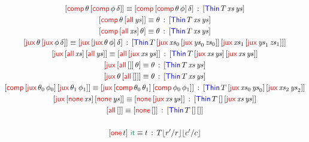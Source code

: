 \documentclass[12pt, a4paper]{article}
\newcommand{\Nil}{\mathbf{[]}}
\newcommand{\sub}{\mathsf{sub}}
\newcommand{\itAtom}{\mathsf{it}}
\newcommand{\gp}{\,}
\newcommand{\forms}[3]{
  \ifthenelse{\equal{{#2}}{}}
  {\textcolor{#3}{\gp {#1}}}
  {[\textcolor{#3}{#1}\gp {#2}]}
}
\newcommand{\elim}[2]{\forms{#1}{#2}{ForestGreen}}
\newcommand{\elimOne}[1]{\gp \textcolor{ForestGreen}{#1}}
\newcommand{\subst}[2]{{#1}\lfloor {#2} \rfloor}
\newcommand{\substfor}[3]{\subst{#1}{ {#2} / {#3} }}
\newcommand{\C}[1]{\textcolor{red}{\mathsf{#1}}}
\newcommand{\D}[1]{\textcolor{blue}{\mathsf{#1}}}
\newcommand{\one}[1]{[ \C{one} \gp  {#1} ]}
\newcommand{\jux}[2]{[ \C{jux} \gp {#1} \gp {#2}]}
\newcommand{\Thin}[3]{[ \D{Thin} \gp {#1} \gp {#2} \gp {#3} ]}
\newcommand{\thAll}[1]{[ \C{all} \gp {#1}]}
\newcommand{\thNone}[1]{[ \C{none} \gp {#1}]}
\newcommand{\thComp}[2]{[ \C{comp} \gp {#1} \gp {#2}]}
\newcommand{\thJux}[2]{[ \C{jux} \gp {#1} \gp {#2}]}
\newcommand{\subElim}[3]{{#1} \gp \elim{\sub}{{#2} \gp {#3}}}
\newcommand{\itElim}[1]{{#1} \gp \elimOne{\itAtom}}
\newcommand{\hasType}[3]{{#1} \vdash {#2} \hab {#3}}
\newcommand{\eqJ}[3]{{#1} \equiv {#2} \hab {#3}}
\newcommand{\hab}{\gp : \gp}
\newcommand{\V}[1]{\mathit{#1}}
\begin{document}
\begin{gather*}
  \eqJ{\thComp{\theta}{\thComp{\phi}{\delta}}}{\thComp{\thComp{\theta}{\phi}}{\delta}}{\Thin{T}{\V{xs}}{\V{ys}}}\\
  \eqJ{\thComp{\theta}{\thAll{\V{ys}}}}{\theta}{\Thin{T}{\V{xs}}{\V{ys}}}\\
  \eqJ{\thComp{\thAll{\V{xs}}}{\theta}}{\theta}{\Thin{T}{\V{xs}}{\V{ys}}}\\
  \eqJ{\thJux{\theta}{\thJux{\phi}{\delta}}}{\thJux{\thJux{\theta}{\phi}}{\delta}}{\Thin{T}{\jux{\V{xs}_0}{\jux{\V{ys}_0}{\V{zs}_0}}}{\jux{\V{xs}_1}{\jux{\V{ys}_1}{\V{zs}_1}}}}\\
  \eqJ{\thJux{\thAll{\V{xs}}}{\thAll{\V{ys}}}}{\thAll{\jux{\V{xs}}{\V{ys}}}}{\Thin{T}{\jux{\V{xs}}{\V{ys}}}{\jux{\V{xs}}{\V{ys}}}}\\
  \eqJ{\thJux{\thAll{\Nil}}{\theta}}{\theta}{\Thin{T}{\V{xs}}{\V{ys}}}\\
  \eqJ{\thJux{\theta}{\thAll{\Nil}}}{\theta}{\Thin{T}{\V{xs}}{\V{ys}}}\\
  \eqJ{\thComp{\thJux{\theta_0}{\phi_0}}{\thJux{\theta_1}{\phi_1}}}{\thJux{\thComp{\theta_0}{\theta_1}}{\thComp{\phi_0}{\phi_1}}}{\Thin{T}{\jux{\V{xs}_0}{\V{ys}_0}}{\jux{\V{xs}_2}{\V{ys}_2}}}\\
  \eqJ{\thJux{\thNone{\V{xs}}}{\thNone{\V{ys}}}}{\thNone{\jux{\V{xs}}{\V{ys}}}}{\Thin{T}{\Nil}{\jux{\V{xs}}{\V{ys}}}}\\
  \eqJ
    {\thAll{\Nil}}
    {\thNone{\Nil}}
    {\Thin{T}{\Nil}{\Nil}}
  \\ \\
  \eqJ
    {\itElim{\one{t}}}
    {t}
    {\substfor{\substfor{T}{r'}{r}}{c'}{c}}\\
  \end{gather*}

\end{document}
